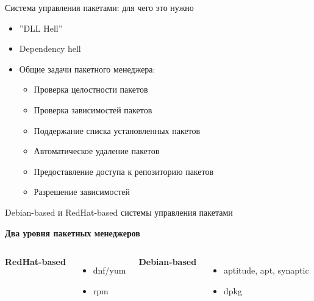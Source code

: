 \begin{frame}{Система управления пакетами: для чего это нужно}
\begin{itemize}
 \item ''DLL Hell''
 \item Dependency hell
 \item Общие задачи пакетного менеджера:
   \begin{itemize}
     \item Проверка целостности пакетов
     \item Проверка зависимостей пакетов
        \item Поддержание списка установленных пакетов
        \item Автоматическое удаление пакетов
     \item Предоставление доступа к репозиторию пакетов
     \item Разрешение зависимостей
   \end{itemize}
\end{itemize}
\end{frame}

\begin{frame}{Debian-based и RedHat-based системы управления пакетами}
\begin{center}
 \textbf{Два уровня пакетных менеджеров}
\end{center}
\begin{columns}
  \begin{center}
    \textbf{RedHat-based}
  \end{center}
  \begin{itemize}
    \item dnf/yum
    \item rpm
  \end{itemize}
  \begin{center}
    \textbf{Debian-based}
  \end{center}
  \begin{itemize}
    \item aptitude, apt, synaptic
    \item dpkg
  \end{itemize}
\end{columns}
\end{frame}
